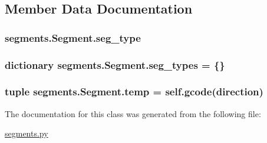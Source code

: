 \subsection{Member Data Documentation}
\hypertarget{classsegments_1_1_segment_adcbfe80739fb05b3e68920b7139219e7}{}
\subsubsection[{seg\+\_\+type}]{\setlength{\rightskip}{0pt plus 5cm}segments.\+Segment.\+seg\+\_\+type}\label{classsegments_1_1_segment_adcbfe80739fb05b3e68920b7139219e7}
\hypertarget{classsegments_1_1_segment_acaccd5af98d8073bdad79805908fefe4}{}
\subsubsection[{seg\+\_\+types}]{\setlength{\rightskip}{0pt plus 5cm}dictionary segments.\+Segment.\+seg\+\_\+types = \{\}\hspace{0.3cm}{\ttfamily [static]}}\label{classsegments_1_1_segment_acaccd5af98d8073bdad79805908fefe4}
\hypertarget{classsegments_1_1_segment_a4861399cabc87392517f539c38bb79d1}{}
\subsubsection[{temp}]{\setlength{\rightskip}{0pt plus 5cm}tuple segments.\+Segment.\+temp = self.\+gcode(direction)\hspace{0.3cm}{\ttfamily [static]}}\label{classsegments_1_1_segment_a4861399cabc87392517f539c38bb79d1}


The documentation for this class was generated from the following file\+:\begin{DoxyCompactItemize}
\item 
\hyperlink{segments_8py}{segments.\+py}\end{DoxyCompactItemize}
